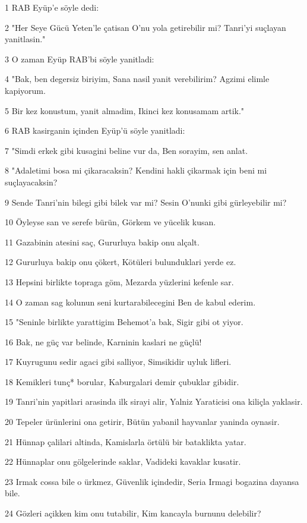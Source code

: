 \par 1 RAB Eyüp'e söyle dedi:
\par 2 "Her Seye Gücü Yeten'le çatisan O'nu yola getirebilir mi? Tanri'yi suçlayan yanitlasin."
\par 3 O zaman Eyüp RAB'bi söyle yanitladi:
\par 4 "Bak, ben degersiz biriyim, Sana nasil yanit verebilirim? Agzimi elimle kapiyorum.
\par 5 Bir kez konustum, yanit almadim, Ikinci kez konusamam artik."
\par 6 RAB kasirganin içinden Eyüp'ü söyle yanitladi:
\par 7 "Simdi erkek gibi kusagini beline vur da, Ben sorayim, sen anlat.
\par 8 "Adaletimi bosa mi çikaracaksin? Kendini hakli çikarmak için beni mi suçlayacaksin?
\par 9 Sende Tanri'nin bilegi gibi bilek var mi? Sesin O'nunki gibi gürleyebilir mi?
\par 10 Öyleyse san ve serefe bürün, Görkem ve yücelik kusan.
\par 11 Gazabinin atesini saç, Gururluya bakip onu alçalt.
\par 12 Gururluya bakip onu çökert, Kötüleri bulunduklari yerde ez.
\par 13 Hepsini birlikte topraga göm, Mezarda yüzlerini kefenle sar.
\par 14 O zaman sag kolunun seni kurtarabilecegini Ben de kabul ederim.
\par 15 "Seninle birlikte yarattigim Behemot'a bak, Sigir gibi ot yiyor.
\par 16 Bak, ne güç var belinde, Karninin kaslari ne güçlü!
\par 17 Kuyrugunu sedir agaci gibi salliyor, Simsikidir uyluk lifleri.
\par 18 Kemikleri tunç* borular, Kaburgalari demir çubuklar gibidir.
\par 19 Tanri'nin yapitlari arasinda ilk sirayi alir, Yalniz Yaraticisi ona kiliçla yaklasir.
\par 20 Tepeler ürünlerini ona getirir, Bütün yabanil hayvanlar yaninda oynasir.
\par 21 Hünnap çalilari altinda, Kamislarla örtülü bir bataklikta yatar.
\par 22 Hünnaplar onu gölgelerinde saklar, Vadideki kavaklar kusatir.
\par 23 Irmak cossa bile o ürkmez, Güvenlik içindedir, Seria Irmagi bogazina dayansa bile.
\par 24 Gözleri açikken kim onu tutabilir, Kim kancayla burnunu delebilir?

